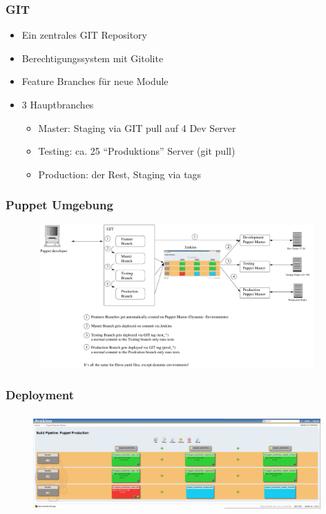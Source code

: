 \documentclass{beamer}
\begin{document}
\begin{frame}
  \frametitle{GIT}

  \begin{itemize}
  \item Ein zentrales GIT Repository
  \item Berechtigungssystem mit Gitolite
  \item Feature Branches für neue Module
  \item 3 Hauptbranches
    \begin{itemize}
    \item Master: Staging via GIT pull auf 4 Dev Server
    \item Testing: ca. 25 ``Produktions'' Server (git pull)
    \item Production: der Rest, Staging via tags
    \end{itemize}
  \end{itemize}
\end{frame}


\begin{frame}
\end{frame}

\begin{frame}
  \frametitle{Puppet Umgebung}
  \begin{figure}[ht]
    \centering
      \includegraphics[height=5.5cm,width=11cm]{../pics/puppet_deployment2}
  \end{figure}
\end{frame}

\begin{frame}
  \frametitle{Deployment}
  \begin{figure}[ht]
    \centering
      \includegraphics[height=3.8cm,width=11cm]{../pics/jenkins_pipeline}
    \label{fig:stack}
  \end{figure}
\end{frame}
\end{document}
